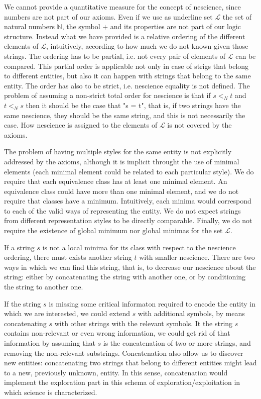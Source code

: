 We cannot provide a quantitative measure for the concept of nescience, since numbers are not part of our axioms. Even if we use as underline set $\mathcal{L}$ the set of natural numbers $\mathbb{N}$, the symbol $+$ and its properties are not part of our logic structure. Instead what we have provided is a relative ordering of the different elements of $\mathcal{L}$, intuitively, according to how much we do not known given those strings. The ordering has to be partial, i.e. not every pair of elements of $\mathcal{L}$ can be compared. This partial order is applicable not only in case of strigs that belong to different entities, but also it can happen with strings that belong to the same entity. The order has also to be strict, i.e. nescience equality is not defined. The problem of assuming a non-strict total order for nescience is that if $s <_N t$ and $t <_N s$ then it should be the case that "s = t", that is, if two strings have the same nescience, they should be the same string, and this is not necessarily the case. How nescience is assigned to the elements of $\mathcal{L}$ is not covered by the axioms.

The problem of having multiple styles for the same entity is not explicitly addressed by the axioms, although it is implicit throught the use of minimal elements (each minimal element could be related to each particular style). We do require that each equivalence class has at least one minimal element. An equivalence class could have more than one minimal element, and we do not require that classes have a minimum. Intuitively, each minima would correspond to each of the valid ways of representing the entity. We do not expect strings from different representation styles to be directly comparable. Finally, we do not require the existence of global minimum nor global minimas for the set $\mathcal{L}$.

If a string $s$ is not a local minima for its class with respect to the nescience ordering, there must exists another string $t$ with smaller nescience. There are two ways in which we can find this string, that is, to decrease our nescience about the string: either by concatenating the string with another one, or by conditioning the string to another one.

If the string $s$ is missing some critical informaton required to encode the entity in which we are interested, we could extend $s$ with additional symbols, by means concatenating $s$ with other strings with the relevant symbols. It the string $s$ contains non-relevant or even wrong information, we could get rid of that information by assuming that $s$ is the concatenation of two or more strings, and removing the non-relevant substrings. Concatenation also allow us to discover new entities: concatenating two strings that belong to different entities might lead to a new, previously unknown, entity. In this sense, concatenation would implement the exploration part in this schema of exploration/exploitation in which science is characterized.

